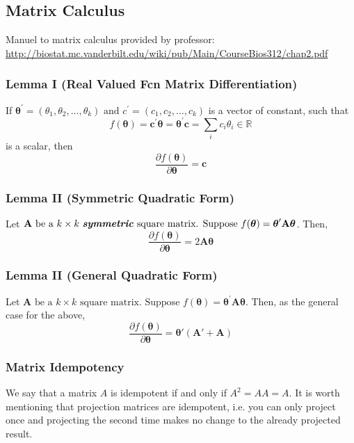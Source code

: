 \documentclass[10pt]{article}
\newcommand{\real}{\mathbb{R}}
\begin{document}
\subsection{Matrix Calculus}
Manuel to matrix calculus provided by professor: \url{http://biostat.mc.vanderbilt.edu/wiki/pub/Main/CourseBios312/chap2.pdf}
\subsubsection{Lemma I (Real Valued Fcn Matrix Differentiation)} If $\boldsymbol{\theta}^{\prime}=\left(\theta_{1}, \theta_{2}, \ldots, \theta_{k}\right) \text { and } c^{\prime}=\left(c_{1}, c_{2}, \ldots, c_{k}\right)$ is a vector of constant, such that 
\begin{equation*}
    f(\boldsymbol{\theta})=\mathbf{c}^{\prime} \boldsymbol{\theta}=\boldsymbol{\theta}^{\prime} \mathbf{c}=\sum_{i} c_{i} \theta_{i} \in \real
\end{equation*}
is a scalar, then
\begin{equation*}
    \frac{\partial f(\boldsymbol{\theta})}{\partial \boldsymbol{\theta}}=\mathbf{c}
\end{equation*}
\subsubsection{Lemma II (Symmetric Quadratic Form)}
Let $\mathbf{A} \text { be a } k \times k \text { \textbf{\textit{symmetric}} square matrix. Suppose } f(\boldsymbol{\theta})=\boldsymbol{\theta}^{\prime} \mathbf{A} \boldsymbol{\theta}$. Then,
\begin{equation*}
    \frac{\partial f(\boldsymbol{\theta})}{\partial \boldsymbol{\theta}}=2 \mathbf{A} \boldsymbol{\theta}
\end{equation*}
\subsubsection{Lemma II (General Quadratic Form)}
Let $\mathbf{A} \text { be a } k \times k \text {~square matrix. Suppose } f(\boldsymbol{\theta})=\boldsymbol{\theta}^{\prime} \mathbf{A} \boldsymbol{\theta}$. Then, \color{BurntOrange} as the general case for the above, 
\color{Black}
\begin{equation*}
    \frac{\partial f(\boldsymbol{\theta})}{\partial \boldsymbol{\theta}}= \boldsymbol{\theta}' (\mathbf{A}' + \mathbf{A})
\end{equation*}


\subsubsection{Matrix Idempotency}
We say that a matrix $A$ is idempotent if and only if $A^2 = AA = A$. It is worth mentioning that projection matrices are idempotent, i.e. you can only project once and projecting the second time makes no change to the already projected result.
\end{document}
